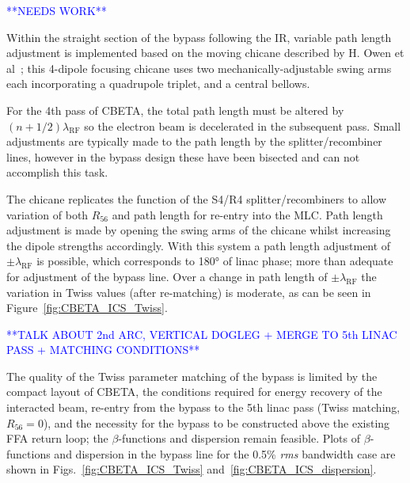 \documentclass[../main.tex]{subfiles}
\begin{document}
\textcolor{blue}{**NEEDS WORK**}

Within the straight section of the bypass following the IR, variable path length adjustment is implemented based on the moving chicane described by H. Owen et al~\cite{owen2012modular}; this 4-dipole focusing chicane uses two mechanically-adjustable swing arms each incorporating a quadrupole triplet, and a central bellows. 

For the 4th pass of CBETA, the total path length must be altered by $(n+1/2)\lambda_{\mathrm{RF}}$ so the electron beam is decelerated in the subsequent pass. Small adjustments are typically made to the path length by the splitter/recombiner lines, however in the bypass design these have been bisected and  can not accomplish this task. 

The chicane replicates the function of the S4/R4 splitter/recombiners to allow variation of both $R_{56}$ and path length for re-entry into the MLC.  Path length adjustment is made by opening the swing arms of the chicane whilst increasing the dipole strengths accordingly. With this system a path length adjustment of $\pm\lambda_{\mathrm{RF}}$ is possible, which corresponds to 180\si{\degree} of linac phase; more than adequate for adjustment of the bypass line. Over a change in path length of $\pm\lambda_{\mathrm{RF}}$ the variation in Twiss values (after re-matching) is moderate, as can be seen in Figure~\ref{fig:CBETA_ICS_Twiss}.

\textcolor{blue}{**TALK ABOUT 2nd ARC, VERTICAL DOGLEG + MERGE TO 5th LINAC PASS + MATCHING CONDITIONS**}

The quality of the Twiss parameter matching of the bypass is limited by the compact layout of CBETA, the conditions required for energy recovery of the interacted beam, re-entry from the bypass to the 5th linac pass (Twiss matching, $R_{56} =0$), and the necessity for the bypass to be constructed above the existing FFA return loop; the $\beta$-functions and dispersion remain feasible. Plots of $\beta$-functions and dispersion in the bypass line for the 0.5\% \textit{rms} bandwidth case are shown in Figs.~\ref{fig:CBETA_ICS_Twiss} and~\ref{fig:CBETA_ICS_dispersion}. 
\end{document}
